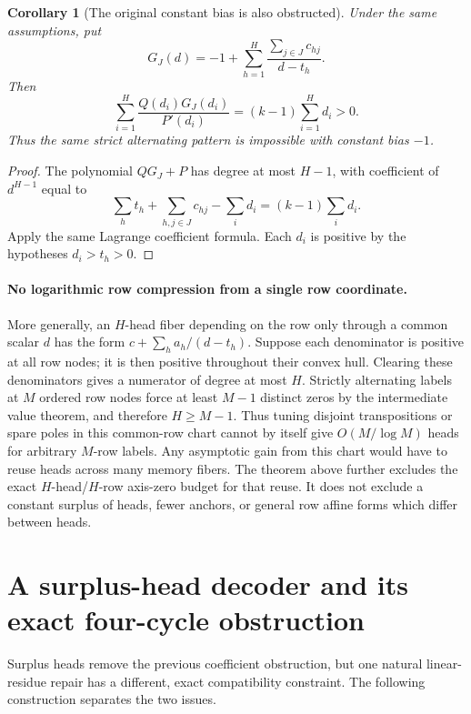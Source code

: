 \documentclass[11pt]{article}
\newtheorem{corollary}[theorem]{Corollary}
\begin{document}
\begin{corollary}[The original constant bias is also obstructed]
Under the same assumptions, put
\[
 G_J(d)=-1+\sum_{h=1}^H
            \frac{\sum_{j\in J}c_{hj}}{d-t_h}.
\]
Then
\[
 \sum_{i=1}^H\frac{Q(d_i)G_J(d_i)}{P'(d_i)}
       =(k-1)\sum_{i=1}^H d_i>0.
\]
Thus the same strict alternating pattern is impossible with constant
bias $-1$.
\end{corollary}

\begin{proof}
The polynomial $QG_J+P$ has degree at most $H-1$, with coefficient
of $d^{H-1}$ equal to
\[
 \sum_h t_h+\sum_{h,j\in J}c_{hj}-\sum_i d_i
       =(k-1)\sum_i d_i.
\]
Apply the same Lagrange coefficient formula. Each $d_i$ is positive
by the hypotheses $d_i>t_h>0$.
\end{proof}

\paragraph{No logarithmic row compression from a single row coordinate.}
More generally, an $H$-head fiber depending on the row only through a
common scalar $d$ has the form $c+\sum_h a_h/(d-t_h)$.
Suppose each denominator is positive at all row nodes; it is then
positive throughout their convex hull. Clearing these denominators
gives a numerator of degree at most $H$. Strictly alternating labels
at $M$ ordered row nodes force
at least $M-1$ distinct zeros by the intermediate value theorem, and
therefore $H\ge M-1$.
Thus tuning disjoint transpositions or spare poles in this common-row
chart cannot by itself give $O(M/\log M)$ heads for arbitrary $M$-row
labels. Any asymptotic gain from this chart would have to reuse heads
across many memory fibers. The theorem above further excludes the
exact $H$-head/$H$-row axis-zero budget for that reuse. It does not
exclude a constant surplus of heads, fewer anchors, or general row
affine forms which differ between heads.

\section{A surplus-head decoder and its exact four-cycle obstruction}

Surplus heads remove the previous coefficient obstruction, but one
natural linear-residue repair has a different, exact compatibility
constraint. The following construction separates the two issues.
\end{document}
